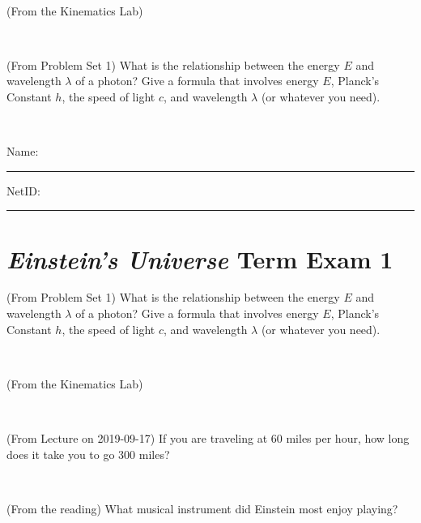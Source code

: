 \documentclass[12pt, letterpaper]{article}
\begin{document}
\vfill ~

\begin{problem} (From the Kinematics Lab)

\end{problem}


\vfill ~

\begin{problem} (From Problem Set 1)
What is the relationship between the energy $E$ and wavelength
$\lambda$ of a photon? Give a formula that involves energy $E$,
Planck's Constant $h$, the speed of light $c$, and wavelength
$\lambda$ (or whatever you need).
\end{problem}

\vfill ~


\cleardoublepage



\noindent
Name: \rule[-1ex]{0.60\textwidth}{0.1pt}
NetID: \rule[-1ex]{0.20\textwidth}{0.1pt}

\section*{\textsl{Einstein's Universe} Term Exam 1}
\setcounter{problem}{1}


\begin{problem} (From Problem Set 1)
What is the relationship between the energy $E$ and wavelength
$\lambda$ of a photon? Give a formula that involves energy $E$,
Planck's Constant $h$, the speed of light $c$, and wavelength
$\lambda$ (or whatever you need).
\end{problem}

\vfill ~

\begin{problem} (From the Kinematics Lab)

\end{problem}


\vfill ~

\begin{problem} (From Lecture on 2019-09-17)
If you are traveling at 60 miles per hour, how long does
it take you to go 300 miles?
\end{problem}


\vfill ~

\begin{problem} (From the reading)
What musical instrument did Einstein most enjoy playing?
\end{problem}


\vfill ~


\clearpage
\end{document}
